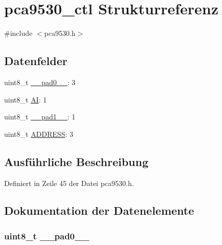 \hypertarget{structpca9530__ctl}{}\section{pca9530\+\_\+ctl Strukturreferenz}
\label{structpca9530__ctl}


{\ttfamily \#include $<$pca9530.\+h$>$}

\subsection*{Datenfelder}
\begin{DoxyCompactItemize}
\item 
uint8\+\_\+t \hyperlink{structpca9530__ctl_a8b4eebe79ded0459acec2f4950102ba3}{\+\_\+\+\_\+pad0\+\_\+\+\_\+}\+: 3
\item 
uint8\+\_\+t \hyperlink{structpca9530__ctl_a8782eaf4d6ff8b39d2ef058050c8a0e3}{A\+I}\+: 1
\item 
uint8\+\_\+t \hyperlink{structpca9530__ctl_a77f12d2e278bd5c07712648ac0df5e08}{\+\_\+\+\_\+pad1\+\_\+\+\_\+}\+: 1
\item 
uint8\+\_\+t \hyperlink{structpca9530__ctl_af3bea2c4759f3d001950aba2a1f89810}{A\+D\+D\+R\+E\+S\+S}\+: 3
\end{DoxyCompactItemize}


\subsection{Ausführliche Beschreibung}


Definiert in Zeile 45 der Datei pca9530.\+h.



\subsection{Dokumentation der Datenelemente}
\hypertarget{structpca9530__ctl_a8b4eebe79ded0459acec2f4950102ba3}{}
\subsubsection[{\+\_\+\+\_\+pad0\+\_\+\+\_\+}]{\setlength{\rightskip}{0pt plus 5cm}uint8\+\_\+t \+\_\+\+\_\+pad0\+\_\+\+\_\+}\label{structpca9530__ctl_a8b4eebe79ded0459acec2f4950102ba3}


